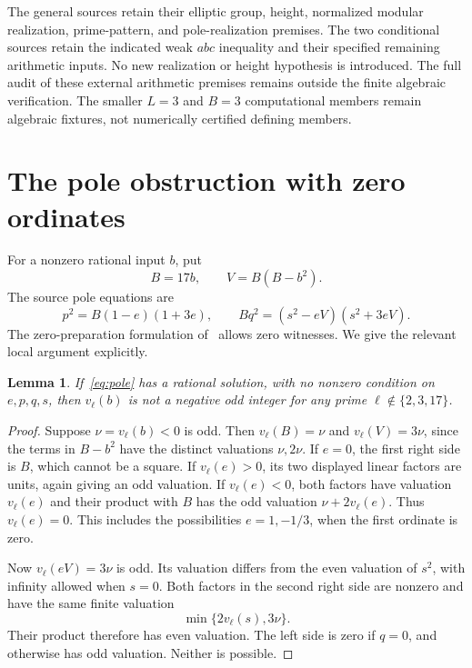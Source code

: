 \documentclass[11pt,a4paper]{article}
\newtheorem{lemma}[theorem]{Lemma}
\begin{document}
The general sources retain their elliptic group, height, normalized
modular realization, prime-pattern, and pole-realization premises.
The two conditional sources retain the indicated weak $abc$ inequality
and their specified remaining arithmetic inputs. No new realization
or height hypothesis is introduced. The full audit of these external
arithmetic premises remains outside the finite algebraic verification.
The smaller $L=3$ and $B=3$ computational members remain algebraic
fixtures, not numerically certified defining members.

\section{The pole obstruction with zero ordinates}
For a nonzero rational input $b$, put
\[
                         B=17b,\qquad V=B(B-b^2).
\]
The source pole equations are
\begin{equation}\label{eq:pole}
                 p^2=B(1-e)(1+3e),\qquad
                 Bq^2=(s^2-eV)(s^2+3eV).
\end{equation}
The zero-preparation formulation of~\cite[Section 3]{Dependencies}
allows zero witnesses. We give the relevant local argument explicitly.

\begin{lemma}\label{lem:pole}
If~\eqref{eq:pole} has a rational solution, with no nonzero condition
on $e,p,q,s$, then $v_\ell(b)$ is not a negative odd integer for any
prime $\ell\notin\{2,3,17\}$.
\end{lemma}
\begin{proof}
Suppose $\nu=v_\ell(b)<0$ is odd. Then $v_\ell(B)=\nu$ and
$v_\ell(V)=3\nu$, since the terms in $B-b^2$ have the distinct
valuations $\nu,2\nu$.
If $e=0$, the first right side is $B$, which cannot be a square.
If $v_\ell(e)>0$, its two displayed linear factors are units, again
giving an odd valuation. If $v_\ell(e)<0$, both factors have valuation
$v_\ell(e)$ and their product with $B$ has the odd valuation
$\nu+2v_\ell(e)$. Thus $v_\ell(e)=0$. This includes the possibilities
$e=1,-1/3$, when the first ordinate is zero.

Now $v_\ell(eV)=3\nu$ is odd. Its valuation differs from the even
valuation of $s^2$, with infinity allowed when $s=0$. Both factors in
the second right side are nonzero and have the same finite valuation
\[
                         \min\{2v_\ell(s),3\nu\}.
\]
Their product therefore has even valuation. The left side is zero if
$q=0$, and otherwise has odd valuation. Neither is possible.
\end{proof}
\end{document}
